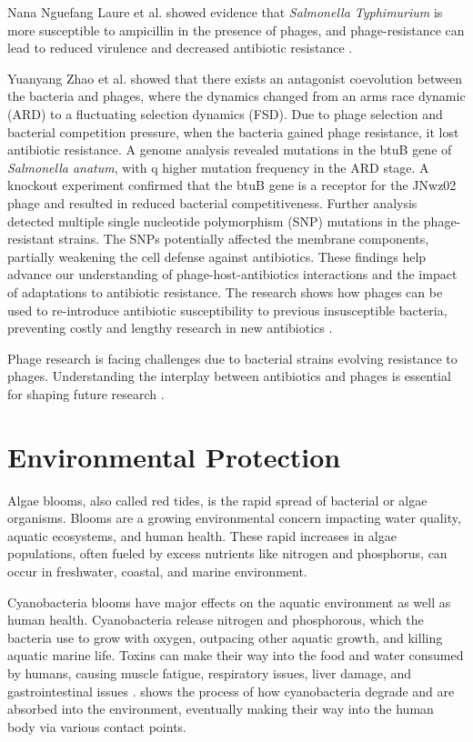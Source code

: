 Nana Nguefang Laure et al. showed evidence that \textit{Salmonella Typhimurium} is more susceptible to ampicillin in the presence of phages, and phage-resistance can lead to reduced virulence and decreased antibiotic resistance \cite{laurePhageResistancemediatedTradeoffs2022}. 

Yuanyang Zhao et al. showed that there exists an antagonist coevolution between the bacteria and phages, where the dynamics changed from an arms race dynamic (ARD) to a fluctuating selection dynamics (FSD).
Due to phage selection and bacterial competition pressure, when the bacteria gained phage resistance, it lost antibiotic resistance.
A genome analysis revealed mutations in the btuB gene of \textit{Salmonella anatum}, with q higher mutation frequency in the ARD stage.
A knockout experiment confirmed that the btuB gene is a receptor for the JNwz02 phage and resulted in reduced bacterial competitiveness.
Further analysis detected multiple single nucleotide polymorphism (SNP) mutations in the phage-resistant strains.
The SNPs potentially affected the membrane components, partially weakening the cell defense against antibiotics.
These findings help advance our understanding of phage-host-antibiotics interactions and the impact of adaptations to antibiotic resistance.
The research shows how phages can be used to re-introduce antibiotic susceptibility to previous insusceptible bacteria, preventing costly and lengthy research in new antibiotics \cite{zhaoPhagedrivenCoevolutionReveals2024}. \newline

Phage research is facing challenges due to bacterial strains evolving resistance to phages.
Understanding the interplay between antibiotics and phages is essential for shaping future research \cite{zhaoPhagedrivenCoevolutionReveals2024}.


\section{Environmental Protection}
Algae blooms, also called red tides, is the rapid spread of bacterial or algae organisms.
Blooms are a growing environmental concern impacting water quality, aquatic ecosystems, and human health.
These rapid increases in algae populations, often fueled by excess nutrients like nitrogen and phosphorus, can occur in freshwater, coastal, and marine environment. 

Cyanobacteria blooms have major effects on the aquatic environment as well as human health.
Cyanobacteria release nitrogen and phosphorous, which the bacteria use to grow with oxygen, outpacing other aquatic growth, and killing aquatic marine life.
Toxins can make their way into the food and water consumed by humans, causing muscle fatigue, respiratory issues, liver damage, and gastrointestinal issues \cite{zhangImpactCyanobacteriaBlooms2022}.
 shows the process of how cyanobacteria degrade and are absorbed into the environment, eventually making their way into the human body via various contact points.
 
